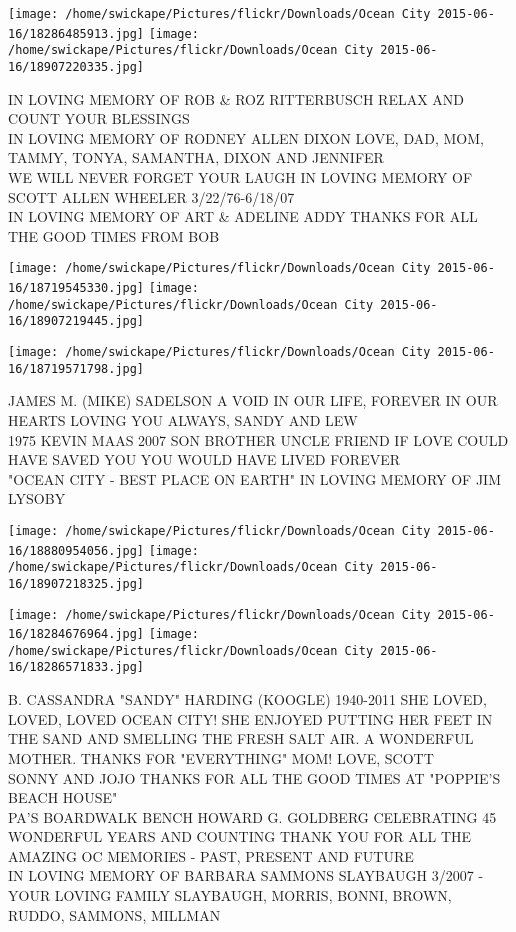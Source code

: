 \documentclass[10pt,letterpaper]{article}
\begin{document}
\texttt{[image: /home/swickape/Pictures/flickr/Downloads/Ocean City 2015-06-16/18286485913.jpg]}
\texttt{[image: /home/swickape/Pictures/flickr/Downloads/Ocean City 2015-06-16/18907220335.jpg]}

IN LOVING MEMORY OF ROB \& ROZ RITTERBUSCH RELAX AND COUNT YOUR BLESSINGS\\
IN LOVING MEMORY OF RODNEY ALLEN DIXON LOVE, DAD, MOM, TAMMY, TONYA, SAMANTHA, DIXON AND JENNIFER\\
WE WILL NEVER FORGET YOUR LAUGH IN LOVING MEMORY OF SCOTT ALLEN WHEELER 3/22/76{-}6/18/07\\
IN LOVING MEMORY OF ART \& ADELINE ADDY THANKS FOR ALL THE GOOD TIMES FROM BOB
\pagebreak

\texttt{[image: /home/swickape/Pictures/flickr/Downloads/Ocean City 2015-06-16/18719545330.jpg]}
\texttt{[image: /home/swickape/Pictures/flickr/Downloads/Ocean City 2015-06-16/18907219445.jpg]}

\vspace{0.25in}
\texttt{[image: /home/swickape/Pictures/flickr/Downloads/Ocean City 2015-06-16/18719571798.jpg]}

JAMES M. (MIKE) SADELSON A VOID IN OUR LIFE, FOREVER IN OUR HEARTS LOVING YOU ALWAYS, SANDY AND LEW\\
1975 KEVIN MAAS 2007 SON BROTHER UNCLE FRIEND IF LOVE COULD HAVE SAVED YOU YOU WOULD HAVE LIVED FOREVER\\
"OCEAN CITY {-} BEST PLACE ON EARTH" IN LOVING MEMORY OF JIM LYSOBY
\pagebreak

\texttt{[image: /home/swickape/Pictures/flickr/Downloads/Ocean City 2015-06-16/18880954056.jpg]}
\texttt{[image: /home/swickape/Pictures/flickr/Downloads/Ocean City 2015-06-16/18907218325.jpg]}

\texttt{[image: /home/swickape/Pictures/flickr/Downloads/Ocean City 2015-06-16/18284676964.jpg]}
\texttt{[image: /home/swickape/Pictures/flickr/Downloads/Ocean City 2015-06-16/18286571833.jpg]}

B. CASSANDRA "SANDY" HARDING (KOOGLE) 1940{-}2011 SHE LOVED, LOVED, LOVED OCEAN CITY!  SHE ENJOYED PUTTING HER FEET IN THE SAND AND SMELLING THE FRESH SALT AIR.  A WONDERFUL MOTHER.  THANKS FOR "EVERYTHING" MOM!  LOVE, SCOTT\\
SONNY AND JOJO THANKS FOR ALL THE GOOD TIMES AT "POPPIE'S BEACH HOUSE"\\
PA'S BOARDWALK BENCH HOWARD G. GOLDBERG CELEBRATING 45 WONDERFUL YEARS AND COUNTING THANK YOU FOR ALL THE AMAZING OC MEMORIES {-} PAST, PRESENT AND FUTURE\\
IN LOVING MEMORY OF BARBARA SAMMONS SLAYBAUGH 3/2007 {-} YOUR LOVING FAMILY SLAYBAUGH, MORRIS, BONNI, BROWN, RUDDO, SAMMONS, MILLMAN
\pagebreak
\end{document}
